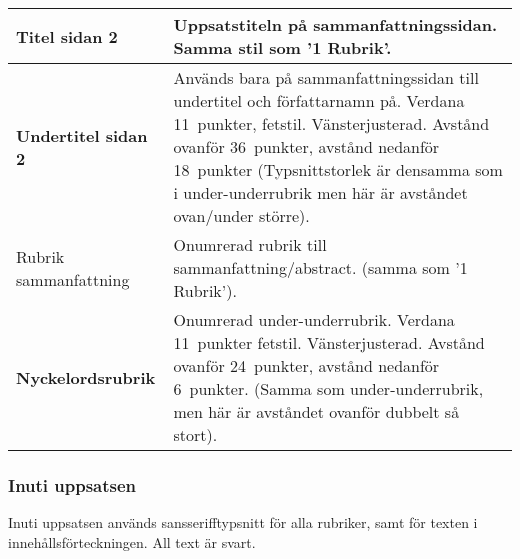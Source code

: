 \begin{longtable}{p{} p{}}
  \toprule
  {\sffamily\raggedright\Large{}Titel sidan 2} &
  Uppsatstiteln på sammanfattningssidan. Samma stil som '1 Rubrik'.
  \\
  \midrule
  {\sffamily\bfseries{}Undertitel sidan 2} &
  Används bara på sammanfattningssidan till undertitel och författarnamn på.
  Verdana 11~punkter, fetstil. Vänsterjusterad.
  Avstånd ovanför 36~punkter, avstånd nedanför 18~punkter (Typsnittstorlek är
  densamma som i under-underrubrik men här är avståndet ovan/under större).
  \\
  \midrule
  {\sffamily\Large\raggedright{}Rubrik sammanfattning} &
  Onumrerad rubrik till sammanfattning/abstract.
  (samma som '1 Rubrik').
  \\
  \midrule
  {\sffamily\bfseries{}Nyckelordsrubrik} &
  Onumrerad under-underrubrik. Verdana 11~punkter fetstil. Vänsterjusterad.
  Avstånd ovanför 24~punkter, avstånd nedanför 6~punkter. (Samma som
  under-underrubrik, men här är avståndet ovanför dubbelt så stort).
  \\
  \bottomrule
\end{longtable}


\subsubsection{Inuti uppsatsen}

Inuti uppsatsen används sansserifftypsnitt för alla rubriker, samt för texten i
innehållsförteckningen. All text är svart.

